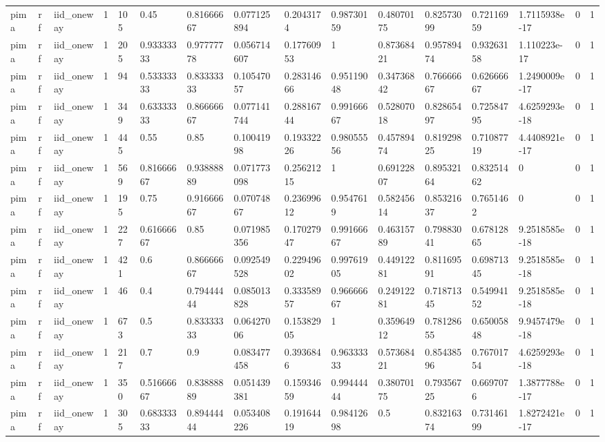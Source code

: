 \begin{tabular}{llllllllllllllll}
pima & rf & iid\_oneway & 1 & 105 & 0.45 & 0.81666667 & 0.077125894 & 0.2043174 & 0.98730159 & 0.48070175 & 0.82573099 & 0.72116959 & 1.7115938e-17 & 0 & 1 \\
pima & rf & iid\_oneway & 1 & 205 & 0.93333333 & 0.97777778 & 0.056714607 & 0.17760953 & 1 & 0.87368421 & 0.95789474 & 0.93263158 & 1.110223e-17 & 0 & 1 \\
pima & rf & iid\_oneway & 1 & 94 & 0.53333333 & 0.83333333 & 0.10547057 & 0.28314666 & 0.95119048 & 0.34736842 & 0.76666667 & 0.62666667 & 1.2490009e-17 & 0 & 1 \\
pima & rf & iid\_oneway & 1 & 349 & 0.63333333 & 0.86666667 & 0.077141744 & 0.28816744 & 0.99166667 & 0.52807018 & 0.82865497 & 0.72584795 & 4.6259293e-18 & 0 & 1 \\
pima & rf & iid\_oneway & 1 & 445 & 0.55 & 0.85 & 0.10041998 & 0.19332226 & 0.98055556 & 0.45789474 & 0.81929825 & 0.71087719 & 4.4408921e-17 & 0 & 1 \\
pima & rf & iid\_oneway & 1 & 569 & 0.81666667 & 0.93888889 & 0.071773098 & 0.25621215 & 1 & 0.69122807 & 0.89532164 & 0.83251462 & 0 & 0 & 1 \\
pima & rf & iid\_oneway & 1 & 195 & 0.75 & 0.91666667 & 0.07074867 & 0.23699612 & 0.9547619 & 0.58245614 & 0.85321637 & 0.7651462 & 0 & 0 & 1 \\
pima & rf & iid\_oneway & 1 & 227 & 0.61666667 & 0.85 & 0.071985356 & 0.17027947 & 0.99166667 & 0.46315789 & 0.79883041 & 0.67812865 & 9.2518585e-18 & 0 & 1 \\
pima & rf & iid\_oneway & 1 & 421 & 0.6 & 0.86666667 & 0.092549528 & 0.22949602 & 0.99761905 & 0.44912281 & 0.81169591 & 0.69871345 & 9.2518585e-18 & 0 & 1 \\
pima & rf & iid\_oneway & 1 & 46 & 0.4 & 0.79444444 & 0.085013828 & 0.33358957 & 0.96666667 & 0.24912281 & 0.71871345 & 0.54994152 & 9.2518585e-18 & 0 & 1 \\
pima & rf & iid\_oneway & 1 & 673 & 0.5 & 0.83333333 & 0.06427006 & 0.15382905 & 1 & 0.35964912 & 0.78128655 & 0.65005848 & 9.9457479e-18 & 0 & 1 \\
pima & rf & iid\_oneway & 1 & 217 & 0.7 & 0.9 & 0.083477458 & 0.3936846 & 0.96333333 & 0.57368421 & 0.85438596 & 0.76701754 & 4.6259293e-18 & 0 & 1 \\
pima & rf & iid\_oneway & 1 & 350 & 0.51666667 & 0.83888889 & 0.051439381 & 0.15934659 & 0.99444444 & 0.38070175 & 0.79356725 & 0.6697076 & 1.3877788e-17 & 0 & 1 \\
pima & rf & iid\_oneway & 1 & 305 & 0.68333333 & 0.89444444 & 0.053408226 & 0.19164419 & 0.98412698 & 0.5 & 0.83216374 & 0.73146199 & 1.8272421e-17 & 0 & 1 \\

\end{tabular}
